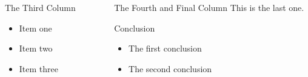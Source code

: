 \documentclass[final]{beamer}
\newlength{\sepwid}
\newlength{\onecolwid}
\begin{document}
\begin{frame}[t]
\begin{columns}[t]
\begin{column}{\onecolwid}
\begin{block}{The Third Column}
\begin{itemize}
    \item Item one
    \item Item two
    \item Item three
\end{itemize}
\end{block}

\end{column} %
\begin{column}{\sepwid}\end{column} %

\begin{column}{\onecolwid} %

\begin{block}{The Fourth and Final Column}
This is the last one.
\end{block}

\begin{block}{Conclusion}
\begin{itemize}
\item The first conclusion
\item The second conclusion
\end{itemize}
\end{block}




\end{column} %
\end{columns} %
\end{frame} %
\end{document}
